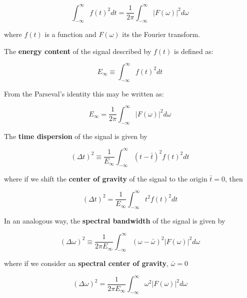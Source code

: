 \begin{equation}\label{eq:parseval_theorem}
	\int_{-\infty}^{\infty} f(t)^2 dt = \frac{1}{2 \pi} \int_{-\infty}^{\infty} |F(\omega)|^2 d\omega
\end{equation}

where $f(t)$ is a function and $F(\omega)$ its the Fourier transform. 

The \textbf{energy content} of the signal described by $f(t)$ is defined as:

\begin{equation}\label{eq:energy_content_time}
    E_{\infty} \equiv \int_{-\infty}^{\infty}  f(t)^2 dt
\end{equation}


From the Parseval's identity this may be written as:

\begin{equation}\label{eq:energy_content_frequency}
    E_{\infty} = \frac{1}{2 \pi} \int_{-\infty}^{\infty} |F(\omega)|^2 d\omega
\end{equation}

The \textbf{time dispersion} of the signal is given by

\begin{equation}\label{eq:time_dispersion_no_centered}
    (\Delta t)^2 \equiv \frac{1}{E_{\infty}} \int_{-\infty}^{\infty} (t-\bar{t})^2 f(t)^2 dt
\end{equation}


where if we shift the \textbf{center of gravity} of the signal to the origin $\bar{t}=0$, then

\begin{equation}\label{eq:time_dispersion}
    (\Delta t)^2 = \frac{1}{E_{\infty}} \int_{-\infty}^{\infty} t^2 f(t)^2 dt
\end{equation}

In an analogous way, the \textbf{spectral bandwidth} of the signal is given by

\begin{equation}\label{eq:spectral_bandwidth_no_centered}
    (\Delta \omega)^2 \equiv \frac{1}{2 \pi E_{\infty}} \int_{-\infty}^{\infty} (\omega-\bar{\omega})^2 |F(\omega)|^2 d\omega
\end{equation}

where if we consider an \textbf{spectral center of gravity}, $\bar{\omega}=0$

\begin{equation}\label{eq:spectral_bandwidth}
    (\Delta \omega)^2 = \frac{1}{2 \pi E_{\infty}} \int_{-\infty}^{\infty} \omega^2 |F(\omega)|^2 d\omega 
\end{equation}

